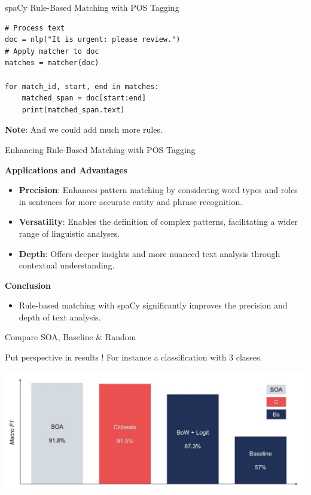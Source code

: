 \documentclass{beamer}
\begin{document}
\begin{frame}[fragile]{spaCy Rule-Based Matching with POS Tagging}

\begin{tcolorbox}[colback=lightgray, colframe=lightgray,
                  boxsep=0mm, arc=1mm, boxrule=0mm,
                  left=1mm, right=1mm, top=1mm, bottom=1mm]
\begin{verbatim}
# Process text
doc = nlp("It is urgent: please review.")
# Apply matcher to doc
matches = matcher(doc)

for match_id, start, end in matches:
    matched_span = doc[start:end]
    print(matched_span.text)
\end{verbatim}
\end{tcolorbox}

\textbf{Note}: And we could add much more rules.

\end{frame}

\begin{frame}{Enhancing Rule-Based Matching with POS Tagging}

\textbf{Applications and Advantages}
\begin{itemize}
  \item \textbf{Precision}: Enhances pattern matching by considering word types and roles in sentences for more accurate entity and phrase recognition.
  \item \textbf{Versatility}: Enables the definition of complex patterns, facilitating a wider range of linguistic analyses.
  \item \textbf{Depth}: Offers deeper insights and more nuanced text analysis through contextual understanding.
\end{itemize}

\textbf{Conclusion}
\begin{itemize}
  \item Rule-based matching with spaCy significantly improves the precision and depth of text analysis.
\end{itemize}

\end{frame}



\begin{frame}{Compare SOA, Baseline \& Random}

Put perspective in results ! For instance a classification with 3 classes.

\centerline{\includegraphics[scale=0.45]{figures/Figure 1.png}}

\end{frame}
\end{document}

